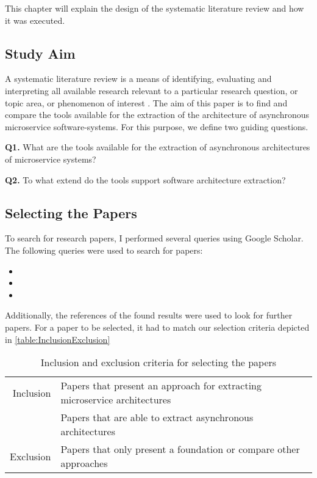This chapter will explain the design of the systematic literature review and how it was executed.

\subsection{Study Aim}
\label{sec:StudyDesign:StudyAim}
A systematic literature review is a means of identifying, evaluating and interpreting all available research relevant to a particular research question, or topic area, or phenomenon of interest \cite{Keele2007guidelines}.
The aim of this paper is to find and compare the tools available for the extraction of the architecture of asynchronous microservice software-systems.
For this purpose, we define two guiding questions.

\textbf{Q1.} What are the tools available for the extraction of asynchronous architectures of microservice systems?

\textbf{Q2.} To what extend do the tools support software architecture extraction?

\subsection{Selecting the Papers}
\label{sec:StudyDesign:SelectingPapers}
To search for research papers, I  performed several queries using Google Scholar.
The following queries were used to search for papers:
\begin{itemize}
	\item {}
	\item {}
	\item {}
\end{itemize}

Additionally, the references of the found results were used to look for further papers.
For a paper to be selected, it had to match our selection criteria depicted in \autoref{table:InclusionExclusion}


\begin{table}
\centering
\begin{tabular}{r l}
\toprule
Inclusion
& Papers that present an approach for extracting microservice architectures \\
& Papers that are able to extract asynchronous architectures \\
\midrule
Exclusion
& Papers that only present a foundation or compare other approaches \\
\bottomrule
\end{tabular}
\caption{Inclusion and exclusion criteria for selecting the papers}
\label{table:InclusionExclusion}
\end{table}


